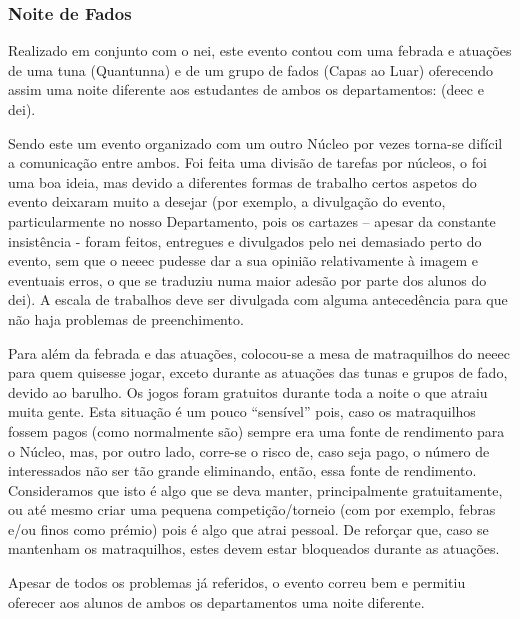 
\subsubsection{Noite de Fados}

Realizado em conjunto com o \acrshort{nei}, este evento contou com uma febrada e atuações de uma tuna (Quantunna) e de um grupo de fados (Capas ao Luar) oferecendo assim uma noite diferente aos estudantes de ambos os departamentos: (\acrshort{deec} e \acrshort{dei}).

Sendo este um evento organizado com um outro Núcleo por vezes torna-se difícil a comunicação entre ambos. Foi feita uma divisão de tarefas por núcleos, o foi uma boa ideia, mas devido a diferentes formas de trabalho certos aspetos do evento deixaram muito a desejar (por exemplo, a divulgação do evento, particularmente no nosso Departamento, pois os cartazes – apesar da constante insistência - foram feitos, entregues e divulgados pelo \acrshort{nei} demasiado perto do evento, sem que o \acrshort{neeec} pudesse dar a sua opinião relativamente à imagem e eventuais erros, o que se traduziu numa maior adesão por parte dos alunos do \acrshort{dei}). A escala de trabalhos deve ser divulgada com alguma antecedência para que não haja problemas de preenchimento.

Para além da febrada e das atuações, colocou-se a mesa de matraquilhos do \acrshort{neeec} para quem quisesse jogar, exceto durante as atuações das tunas e grupos de fado, devido ao barulho. Os jogos foram gratuitos durante toda a noite o que atraiu muita gente. Esta situação é um pouco “sensível” pois, caso os matraquilhos fossem pagos (como normalmente são) sempre era uma fonte de rendimento para o Núcleo, mas, por outro lado, corre-se o risco de, caso seja pago, o número de interessados não ser tão grande eliminando, então, essa fonte de rendimento. Consideramos que isto é algo que se deva manter, principalmente gratuitamente, ou até mesmo criar uma pequena competição/torneio (com por exemplo, febras e/ou finos como prémio) pois é algo que atrai pessoal. De reforçar que, caso se mantenham os matraquilhos, estes devem estar bloqueados durante as atuações.

Apesar de todos os problemas já referidos, o evento correu bem e permitiu oferecer aos alunos de ambos os departamentos uma noite diferente.
